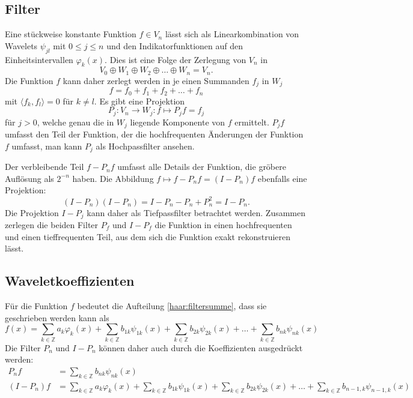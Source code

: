 \subsection{Filter}\label{haar:approximation:filter}
Eine stückweise konstante Funktion $f\in V_n$ lässt sich als Linearkombination
von Wavelets $\psi_{jl}$ mit $0\le j \le n$ und den Indikatorfunktionen
auf den Einheitsintervallen $\varphi_k(x)$. 
Dies ist eine Folge der Zerlegung von $V_n$ in
\begin{equation}
V_0 \oplus W_1 \oplus W_2 \oplus \dots \oplus W_n = V_n.
\label{haar:filtersumme}
\end{equation}
Die Funktion $f$ kann daher zerlegt werden in je einen Summanden $f_j$ in $W_j$
\[
f = f_0 + f_1 + f_2 + \dots + f_n
\]
mit $\langle f_k,f_l\rangle = 0$ für $k\ne l$.
Es gibt eine Projektion
\[
P_j \colon V_n \to W_j : f \mapsto P_jf = f_j
\]
für $j>0$, welche genau die in $W_j$ liegende Komponente von $f$ 
ermittelt.
$P_jf$ umfasst den Teil der Funktion, der die hochfrequenten Änderungen
der Funktion $f$ umfasst, man kann $P_j$ als Hochpassfilter ansehen.

Der verbleibende Teil $f-P_nf$ umfasst alle Details der Funktion, die
gröbere Auflösung als $2^{-n}$ haben.
Die Abbildung $f\mapsto f-P_nf = (I-P_n)f$ ebenfalls eine Projektion:
\[
(I-P_n)(I-P_n) = I -P_n - P_n + P_n^2 = I - P_n.
\]
Die Projektion $I-P_j$ kann daher als Tiefpassfilter betrachtet werden.
Zusammen zerlegen die beiden Filter $P_f$ und $I-P_f$ die Funktion
in einen hochfrequenten und einen tieffrequenten Teil, aus dem sich
die Funktion exakt rekonstruieren lässt.

\subsection{Waveletkoeffizienten}
Für die Funktion $f$ bedeutet die Aufteilung \eqref{haar:filtersumme},
dass sie geschrieben werden kann als
\[
f(x)
=
\sum_{k\in\mathbb Z} a_k\varphi_k(x)
+
\sum_{k\in\mathbb Z} b_{1k}\psi_{1k}(x)
+
\sum_{k\in\mathbb Z} b_{2k}\psi_{2k}(x)
+
\dots
+
\sum_{k\in\mathbb Z} b_{nk}\psi_{nk}(x)
\]
Die Filter $P_n$ und $I-P_n$ können daher auch durch die Koeffizienten
ausgedrückt werden:
\begin{align*}
P_nf 
&=
\sum_{k\in\mathbb Z} b_{nk}\psi_{nk}(x)
\\
(I-P_n)f
&=
\sum_{k\in\mathbb Z} a_k\varphi_k(x)
+
\sum_{k\in\mathbb Z} b_{1k}\psi_{1k}(x)
+
\sum_{k\in\mathbb Z} b_{2k}\psi_{2k}(x)
+
\dots
+
\sum_{k\in\mathbb Z} b_{n-1,k}\psi_{n-1,k}(x)
\end{align*}

